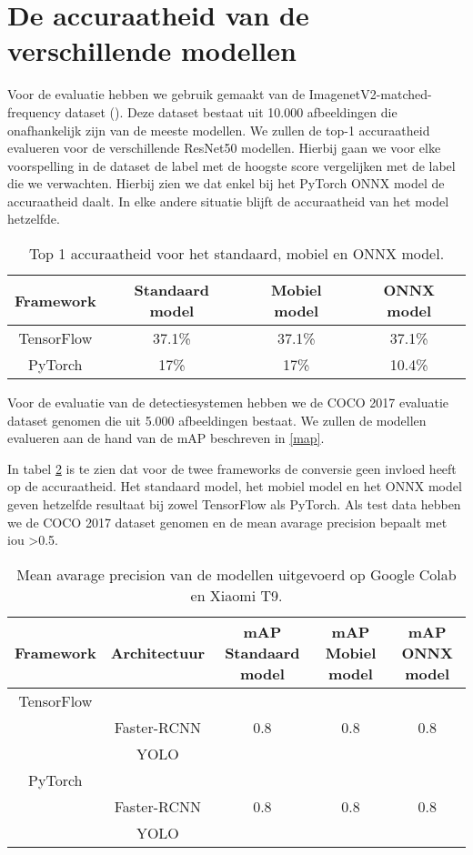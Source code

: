 \section{De accuraatheid van de verschillende modellen}

Voor de evaluatie hebben we gebruik gemaakt van de ImagenetV2-matched-frequency dataset (\cite{recht2019imagenet}).
Deze dataset bestaat uit 10.000 afbeeldingen die onafhankelijk zijn van de meeste modellen.
We zullen de top-1 accuraatheid evalueren voor de verschillende ResNet50 modellen.
Hierbij gaan we voor elke voorspelling in de dataset de label met de hoogste score vergelijken met de label die we verwachten.
Hierbij zien we dat enkel bij het PyTorch ONNX model de accuraatheid daalt.
In elke andere situatie blijft de accuraatheid van het model hetzelfde.

\begin{table}[!ht]
    \caption{Top 1 accuraatheid voor het standaard, mobiel en ONNX model.}
\begin{tabular}{cccc}
    \hline
    Framework & Standaard model & Mobiel model & ONNX model \\
    \hline
    TensorFlow & 37.1\% & 37.1\% & 37.1\%  \\
    PyTorch & 17\% & 17\% & 10.4\%  \\
    \hline
\end{tabular}
\label{tab:class_acc}
\end{table}

Voor de evaluatie van de detectiesystemen hebben we de COCO 2017 evaluatie dataset genomen die uit 5.000 afbeeldingen bestaat.
We zullen de modellen evalueren aan de hand van de mAP beschreven in \ref{map}.

In tabel \ref{tab:rcnn_acc} is te zien dat voor de twee frameworks de conversie geen invloed heeft op de accuraatheid.
Het standaard model, het mobiel model en het ONNX model geven hetzelfde resultaat bij zowel TensorFlow als PyTorch.
Als test data hebben we de COCO 2017 dataset genomen en de mean avarage precision bepaalt met iou \textgreater 0.5.
\begin{table}[!ht]
    \caption{Mean avarage precision van de modellen uitgevoerd op Google Colab en Xiaomi T9.}
\begin{tabular}{ccccc}
    \hline
    Framework & Architectuur & mAP Standaard model & mAP Mobiel model & mAP ONNX model\\
    \hline
    TensorFlow & & & & \\
     & Faster-RCNN & 0.8 & 0.8 & 0.8 \\
     & YOLO & & & \\
    PyTorch & & & & \\
     & Faster-RCNN & 0.8 & 0.8 & 0.8 \\
     & YOLO & & & \\
    \hline
\end{tabular}
\label{tab:rcnn_acc}
\end{table}

